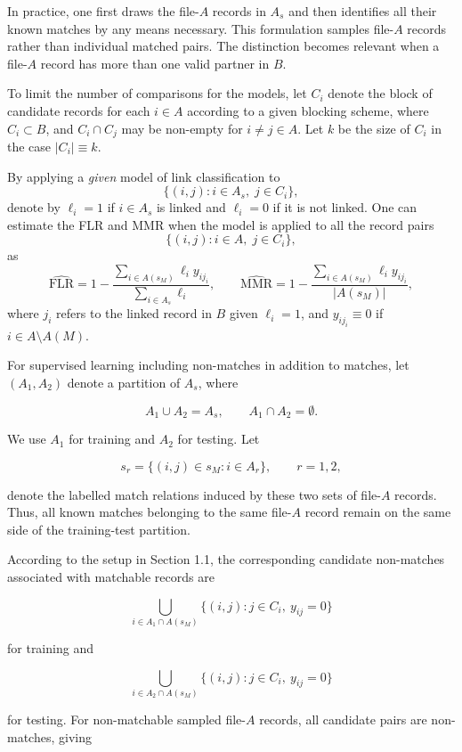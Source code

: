 In practice, one first draws the file-$A$ records in $A_s$ and then identifies all
their known matches by any means necessary. This formulation samples file-$A$
records rather than individual matched pairs. The distinction becomes relevant when
a file-$A$ record has more than one valid partner in $B$.

To limit the number of comparisons for the models, let $C_i$ denote the block of candidate records for each $i \in A$ according to a given blocking scheme, where
$C_i \subset B$, and $C_i \cap C_j$ may be non-empty for $i \neq j \in A$. Let $k$ be the size of $C_i$ in the case $|C_i| \equiv k$.

By applying a \emph{given} model of link classification to
\[
\{(i,j) : i \in A_s,\; j \in C_i\},
\]
denote by $\ell_i=1$ if $i \in A_s$ is linked and $\ell_i=0$ if it is not linked. One can estimate the FLR and MMR when the model is applied to all the record pairs
\[
\{(i,j) : i \in A,\; j \in C_i\},
\]
as
\begin{equation}
\label{eq:FLR:MMR}
\widehat{\mathrm{FLR}}
=
1-
\frac{
\sum_{i \in A(s_M)} \ell_i y_{ij_i}
}{
\sum_{i \in A_s} \ell_i
},
\qquad
\widehat{\mathrm{MMR}}
=
1-
\frac{
\sum_{i \in A(s_M)} \ell_i y_{ij_i}
}{
|A(s_M)|
},
\end{equation}
where $j_i$ refers to the linked record in $B$ given $\ell_i=1$, and
$y_{ij_i} \equiv 0$ if $i \in A \setminus A(M)$.

For supervised learning including non-matches in addition to matches, let
$(A_1,A_2)$ denote a partition of $A_s$, where

\[
A_1\cup A_2=A_s,
\qquad
A_1\cap A_2=\emptyset.
\]

We use $A_1$ for training and $A_2$ for testing. Let

\[
s_r=\{(i,j)\in s_M:i\in A_r\},
\qquad r=1,2,
\]

denote the labelled match relations induced by these two sets of file-$A$ records.
Thus, all known matches belonging to the same file-$A$ record remain on the same
side of the training-test partition.

According to the setup in Section 1.1, the corresponding candidate non-matches
associated with matchable records are

\[
\bigcup_{i\in A_1\cap A(s_M)}
\{(i,j):j\in C_i,\ y_{ij}=0\}
\]

for training and

\[
\bigcup_{i\in A_2\cap A(s_M)}
\{(i,j):j\in C_i,\ y_{ij}=0\}
\]

for testing. For non-matchable sampled file-$A$ records, all candidate pairs are
non-matches, giving


